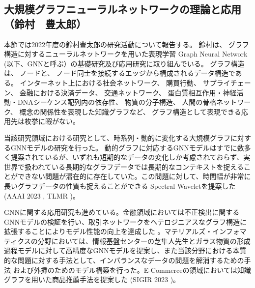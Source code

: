 
\subsection{大規模グラフニューラルネットワークの理論と応用（鈴村　豊太郎）}

本節では2022年度の鈴村豊太郎の研究活動について報告する。 鈴村は、 グラフ構造に対するニューラルネットワークを用いた表現学習 Graph Neural Network (以下、GNNと呼ぶ）の基礎研究及び応用研究に取り組んでいる。 グラフ構造は、 ノードと、 ノード同士を接続するエッジから構成されるデータ構造である。 インターネット上における社会ネットワーク、 購買行動、 サプライチェーン、 金融における決済データ、 交通ネットワーク、 蛋白質相互作用・神経活動・DNAシーケンス配列内の依存性、 物質の分子構造、 人間の骨格ネットワーク、 概念の関係性を表現した知識グラフなど、 グラフ構造として表現できる応用先は枚挙に暇がない。
\par
当該研究領域における研究として、時系列・動的に変化する大規模グラフに対するGNNモデルの研究を行った。
動的グラフに対応するGNNモデルはすでに数多く提案されているが、いずれも短期的なデータの変化しか考慮されておらず、実世界で扱われている長期的なグラフデータでは長期的なコンテキストを捉えることができない問題が潜在的に存在していた。この問題に対して、時間幅が非常に長いグラフデータの性質も捉えることができる Spectral Waveletを提案した(AAAI 2023 \cite{aaai-deft}, TLMR \cite{feta})。

GNNに関する応用研究も進めている。金融領域においては不正検出に関するGNNモデルの検証を行い、取引ネットワークをヘテロジニアスなグラフ構造に拡張することによりモデル性能の向上を達成した \cite{eth-gnn}。マテリアルズ・インフォマティクスの分野においては、情報基盤センターの芝隼人先生とガラス物質の形成過程モデルに対して高精度なGNNモデルを提案し\cite{botan}、また当該分野における本質的な問題に対する手法として、インバランスなデータの問題を解消するための手法 \cite{xsig-limin}および外挿のためのモデル構築を行った\cite{xsig-takashige}。E-Commerceの領域においては知識グラフを用いた商品推薦手法を提案した (SIGIR 2023 \cite{sigir})。

